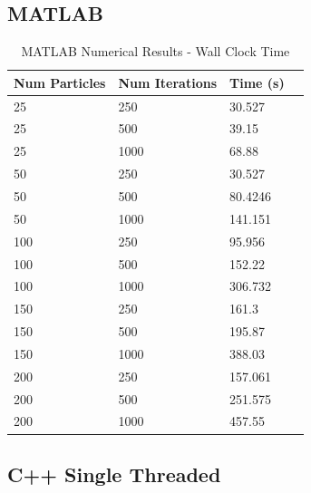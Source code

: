 \subsection{MATLAB}

\begin{table}[H]
    \centering
    \begin{tabular}{@{}llll@{}}
    \toprule
    \textbf{Num Particles} & \textbf{Num Iterations} & \textbf{Time (s)} \\ \midrule
    25                        & 250            & 30.527   \\
    25                        & 500            & 39.15    \\
    25                        & 1000           & 68.88    \\
    50                        & 250            & 30.527   \\
    50                        & 500            & 80.4246  \\
    50                        & 1000           & 141.151  \\
    100                      & 250            & 95.956   \\
    100                      & 500            & 152.22   \\
    100                      & 1000           & 306.732  \\
    150                      & 250            & 161.3    \\
    150                      & 500            & 195.87   \\
    150                      & 1000           & 388.03   \\
    200                      & 250            & 157.061  \\
    200                      & 500            & 251.575  \\
    200                      & 1000           & 457.55   \\ \bottomrule
    \end{tabular}
    \caption{MATLAB Numerical Results - Wall Clock Time}
    \label{tab:MATLAB-speedup}
    \end{table}

\subsection{C++ Single Threaded}

